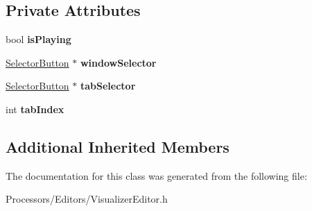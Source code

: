 \subsection*{Private Attributes}
\begin{DoxyCompactItemize}
\item 
\hypertarget{classVisualizerEditor_af4ba7076b26c11ae8e2dc6fb33d3c8f4}{bool {\bfseries is\-Playing}}\label{classVisualizerEditor_af4ba7076b26c11ae8e2dc6fb33d3c8f4}

\item 
\hypertarget{classVisualizerEditor_a064cde76d690f3fefb6d7d529542387d}{\hyperlink{classSelectorButton}{Selector\-Button} $\ast$ {\bfseries window\-Selector}}\label{classVisualizerEditor_a064cde76d690f3fefb6d7d529542387d}

\item 
\hypertarget{classVisualizerEditor_a2f6bf303ca3d0b250bc6b9df2505360a}{\hyperlink{classSelectorButton}{Selector\-Button} $\ast$ {\bfseries tab\-Selector}}\label{classVisualizerEditor_a2f6bf303ca3d0b250bc6b9df2505360a}

\item 
\hypertarget{classVisualizerEditor_a9cd7fd0eaaddb352342f5d76de5cdb57}{int {\bfseries tab\-Index}}\label{classVisualizerEditor_a9cd7fd0eaaddb352342f5d76de5cdb57}

\end{DoxyCompactItemize}
\subsection*{Additional Inherited Members}


The documentation for this class was generated from the following file\-:\begin{DoxyCompactItemize}
\item 
Processors/\-Editors/Visualizer\-Editor.\-h\end{DoxyCompactItemize}
